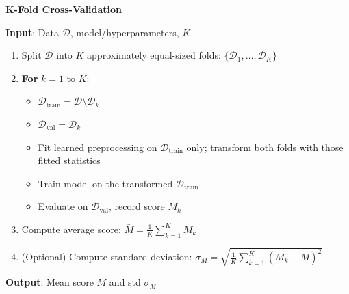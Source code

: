 \documentclass[11pt,twoside]{article}
\numberwithin{equation}{section}
\theoremstyle{plain}
\theoremstyle{definition}
\theoremstyle{remark}
\begin{document}
\begin{algorithmbox}
\textbf{K-Fold Cross-Validation}

\textbf{Input}: Data $\mathcal{D}$, model/hyperparameters, $K$

\begin{enumerate}
\item Split $\mathcal{D}$ into $K$ approximately equal-sized folds: $\{\mathcal{D}_1, \ldots, \mathcal{D}_K\}$

\item \textbf{For} $k = 1$ to $K$:
\begin{itemize}
\item $\mathcal{D}_{\text{train}} = \mathcal{D} \setminus \mathcal{D}_k$
\item $\mathcal{D}_{\text{val}} = \mathcal{D}_k$
\item Fit learned preprocessing on $\mathcal{D}_{\text{train}}$ only; transform both folds with those fitted statistics
\item Train model on the transformed $\mathcal{D}_{\text{train}}$
\item Evaluate on $\mathcal{D}_{\text{val}}$, record score $M_k$
\end{itemize}

\item Compute average score: $\bar{M} = \frac{1}{K}\sum_{k=1}^K M_k$

\item (Optional) Compute standard deviation: $\sigma_M = \sqrt{\frac{1}{K}\sum_{k=1}^K (M_k - \bar{M})^2}$
\end{enumerate}

\textbf{Output}: Mean score $\bar{M}$ and std $\sigma_M$
\end{algorithmbox}
\end{document}
